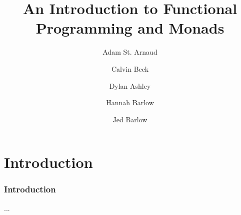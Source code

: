 \documentclass[]{beamer}
\title{An Introduction to Functional Programming and Monads}
\author{Adam St. Arnaud\\
  \and Calvin Beck\\
  \and Dylan Ashley\\
  \and Hannah Barlow\\
  \and Jed Barlow}
\begin{document}
\begin{frame}
\maketitle
\end{frame}

\section{Introduction}
\begin{frame}
    \frametitle{Introduction}
    ...
\end{frame}
\end{document}
